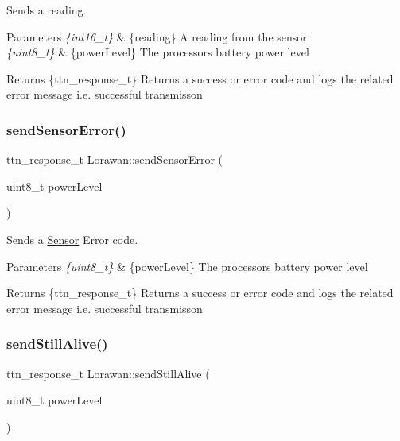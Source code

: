 Sends a reading. 
\begin{DoxyParams}{Parameters}
{\em \{int16\+\_\+t\}} & \{reading\} A reading from the sensor \\
\hline
{\em \{uint8\+\_\+t\}} & \{power\+Level\} The processor\textquotesingle{}s battery power level \\
\hline
\end{DoxyParams}
\begin{DoxyReturn}{Returns}
\{ttn\+\_\+response\+\_\+t\} Returns a success or error code and logs the related error message i.\+e. \textquotesingle{}successful transmisson\textquotesingle{} 
\end{DoxyReturn}
\mbox{\label{class_lorawan_a53f239940033d3a5630f4876911038f6}} 
\subsubsection{\texorpdfstring{send\+Sensor\+Error()}{sendSensorError()}}
{\footnotesize\ttfamily ttn\+\_\+response\+\_\+t Lorawan\+::send\+Sensor\+Error (\begin{DoxyParamCaption}\item[{uint8\+\_\+t}]{power\+Level }\end{DoxyParamCaption})}

Sends a \mbox{\hyperlink{class_sensor}{Sensor}} Error code. 
\begin{DoxyParams}{Parameters}
{\em \{uint8\+\_\+t\}} & \{power\+Level\} The processor\textquotesingle{}s battery power level \\
\hline
\end{DoxyParams}
\begin{DoxyReturn}{Returns}
\{ttn\+\_\+response\+\_\+t\} Returns a success or error code and logs the related error message i.\+e. \textquotesingle{}successful transmisson\textquotesingle{} 
\end{DoxyReturn}
\mbox{\label{class_lorawan_ae070b6740ad21efb2bd3355af0f49792}} 
\subsubsection{\texorpdfstring{send\+Still\+Alive()}{sendStillAlive()}}
{\footnotesize\ttfamily ttn\+\_\+response\+\_\+t Lorawan\+::send\+Still\+Alive (\begin{DoxyParamCaption}\item[{uint8\+\_\+t}]{power\+Level }\end{DoxyParamCaption})}

